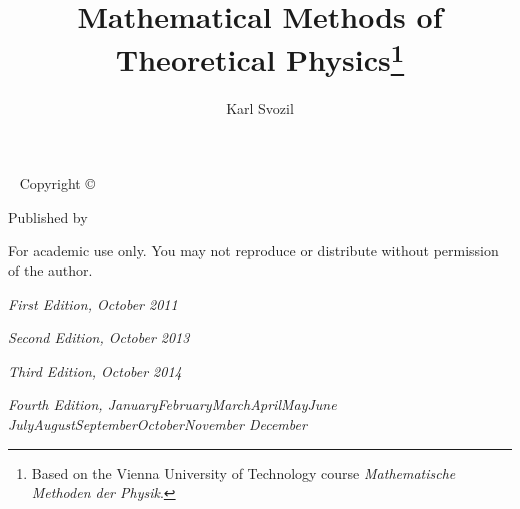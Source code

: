\documentclass[a4paper]{tufte-book}
\title{Mathematical Methods of Theoretical Physics\thanks{Based on the Vienna University of Technology course {\em Mathematische Methoden der Physik}.}}
\author[Karl Svozil]{Karl Svozil}
\renewcommand{\smallcaps}[1]{\color{Grey} \sffamily #1}
\newcommand{\monthyear}{%
  \ifcase\month\or January\or February\or March\or April\or May\or June\or
  July\or August\or September\or October\or November\or
  December\fi\space\number\year
}
\newcommand{\blankpage}{\newpage\hbox{}\thispagestyle{empty}\newpage}
\begin{document}
\sloppy





\maketitle


\newpage
\begin{fullwidth}
~\vfill
\thispagestyle{empty}
\setlength{\parindent}{0pt}
\setlength{\parskip}{\baselineskip}
Copyright \copyright\ \the\year\ \thanklessauthor

\par\smallcaps{Published by \thanklesspublisher}

\par For academic use only. You may not reproduce or distribute without permission of the author.

\par\textit{First Edition, October 2011}
\par\textit{Second Edition, October 2013}
\par\textit{Third Edition, October 2014}
\par\textit{Fourth Edition, \monthyear}
\end{fullwidth}



\tableofcontents











\mainmatter
\thispagestyle{fancy}



\cleardoublepage
\setcounter{page}{1}
%
\end{document}
